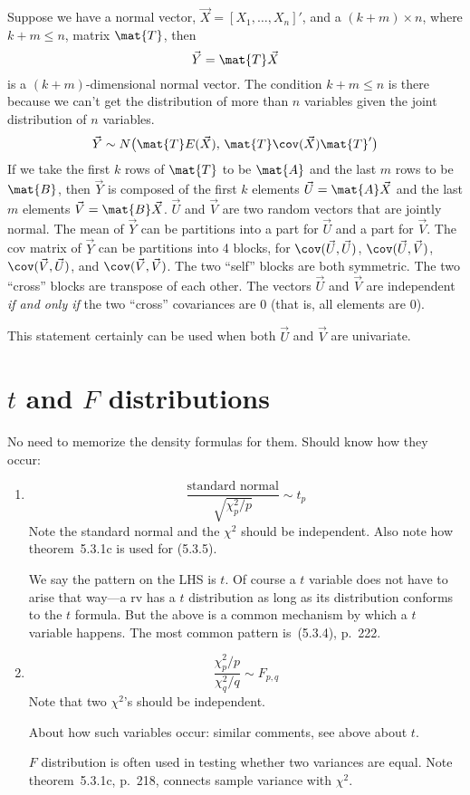 \documentclass[12pt]{article}
\begin{document}
Suppose we have a normal vector,
$\vec{X} = [X_1,\dotsc,X_n]'$,
and a $(k+m)\times n$, where $k+m \le n$,
matrix $\mat{T}$, then
\[
\vec{Y} = \mat{T}\vec{X}
\]
is a $(k+m)$-dimensional normal vector.
The condition $k+m \le n$ is there because we can't
get the distribution of more than $n$ variables
given the joint distribution of $n$ variables.
\[
\vec{Y} \sim N\bigl(\mat{T}E(\vec{X}),\,
    \mat{T}\cov(\vec{X})\mat{T}'\bigr)
\]
If we take the first $k$ rows of $\mat{T}$ to be
$\mat{A}$ and the last $m$ rows to be $\mat{B}$,
then $\vec{Y}$ is composed of the first $k$ elements
$\vec{U} = \mat{A}\vec{X}$ and the last $m$ elements
$\vec{V} = \mat{B}\vec{X}$.
$\vec{U}$ and $\vec{V}$ are two random vectors that are jointly normal.
The mean of $\vec{Y}$ can be partitions into a part for $\vec{U}$
and a part for $\vec{V}$.
The cov matrix of $\vec{Y}$ can be partitions into 4 blocks,
for $\cov(\vec{U}, \vec{U})$,
$\cov(\vec{U}, \vec{V})$, $\cov(\vec{V}, \vec{U})$,
and $\cov(\vec{V}, \vec{V})$.
The two ``self'' blocks are both symmetric.
The two ``cross'' blocks are transpose of each other.
The vectors $\vec{U}$ and $\vec{V}$ are independent
\emph{if and only if} the two ``cross'' covariances are 0
(that is, all elements are 0).

This statement certainly can be used when both $\vec{U}$ and $\vec{V}$
are univariate.

\section{$t$ and $F$ distributions}

No need to memorize the density formulas for them.
Should know how they occur:
\begin{enumerate}
\item
\[
\frac{\text{standard normal}}{\sqrt{\chi^2_p/p}} \sim t_p
\]
Note the standard normal and the $\chi^2$ should be independent.
Also note how theorem~5.3.1c is used for (5.3.5).

We say the pattern on the LHS is $t$.
Of course a $t$ variable does not have to arise that way---a rv has a
$t$ distribution as long as its distribution conforms to the $t$
formula. But the above is a common mechanism by which a $t$ variable
happens. The most common pattern is~(5.3.4), p.~222.

\item
\[
\frac{\chi^2_p / p}{\chi^2_q / q} \sim F_{p,q}
\]
Note that two $\chi^2$'s should be independent.

About how such variables occur: similar comments, see above about $t$.

$F$ distribution is often used in testing whether two variances are
equal. Note theorem~5.3.1c, p.~218, connects sample variance with
$\chi^2$.
\end{enumerate}
\end{document}
